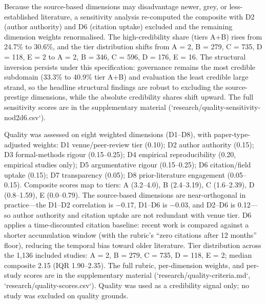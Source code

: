 Because the source-based dimensions may disadvantage newer, grey, or less-established literature, a sensitivity analysis re-computed the composite with D2 (author authority) and D6 (citation uptake) excluded and the remaining dimension weights renormalised. The high-credibility share (tiers A+B) rises from 24.7\% to 30.6\%, and the tier distribution shifts from A = 2, B = 279, C = 735, D = 118, E = 2 to A = 2, B = 346, C = 596, D = 176, E = 16. The structural inversion persists under this specification: governance remains the most credible subdomain (33.3\% to 40.9\% tier A+B) and evaluation the least credible large strand, so the headline structural findings are robust to excluding the source-prestige dimensions, while the absolute credibility shares shift upward. The full sensitivity scores are in the supplementary material (`research/quality-sensitivity-nod2d6.csv`).

Quality was assessed on eight weighted dimensions (D1--D8), with paper-type-adjusted weights: D1 venue/peer-review tier (0.10); D2 author authority (0.15); D3 formal-methods rigour (0.15--0.25); D4 empirical reproducibility (0.20, empirical studies only); D5 argumentative rigour (0.15--0.25); D6 citation/field uptake (0.15); D7 transparency (0.05); D8 prior-literature engagement (0.05--0.15). Composite scores map to tiers: A (3.2--4.0), B (2.4--3.19), C (1.6--2.39), D (0.8--1.59), E (0.0--0.79). The source-based dimensions are near-orthogonal in practice---the D1--D2 correlation is $-0.17$, D1--D6 is $-0.03$, and D2--D6 is 0.12---so author authority and citation uptake are not redundant with venue tier. D6 applies a time-discounted citation baseline: recent work is compared against a shorter accumulation window (with the rubric's ``zero citations after 12 months'' floor), reducing the temporal bias toward older literature. Tier distribution across the 1,136 included studies: A = 2, B = 279, C = 735, D = 118, E = 2; median composite 2.15 (IQR 1.90--2.35). The full rubric, per-dimension weights, and per-study scores are in the supplementary material (`research/quality-criteria.md`, `research/quality-scores.csv`). Quality was used as a credibility signal only; no study was excluded on quality grounds.


